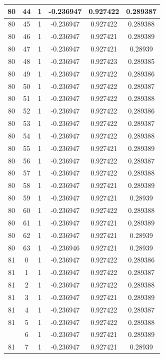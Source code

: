 \documentclass[12pt,a4paper]{article}
\numberwithin{equation}{section}
\numberwithin{figure}{section}
\numberwithin{table}{section}
\begin{document}
\begin{longtable}{|c|c|c|c|c|c|}
80 & 44 & 1 & -0.236947 & 0.927422 & 0.289387 \\ \hline
80 & 45 & 1 & -0.236947 & 0.927422 & 0.289388 \\ \hline
80 & 46 & 1 & -0.236947 & 0.927421 & 0.289389 \\ \hline
80 & 47 & 1 & -0.236947 & 0.927421 & 0.28939 \\ \hline
80 & 48 & 1 & -0.236947 & 0.927423 & 0.289385 \\ \hline
80 & 49 & 1 & -0.236947 & 0.927422 & 0.289386 \\ \hline
80 & 50 & 1 & -0.236947 & 0.927422 & 0.289387 \\ \hline
80 & 51 & 1 & -0.236947 & 0.927422 & 0.289388 \\ \hline
80 & 52 & 1 & -0.236947 & 0.927422 & 0.289386 \\ \hline
80 & 53 & 1 & -0.236947 & 0.927422 & 0.289387 \\ \hline
80 & 54 & 1 & -0.236947 & 0.927422 & 0.289388 \\ \hline
80 & 55 & 1 & -0.236947 & 0.927421 & 0.289389 \\ \hline
80 & 56 & 1 & -0.236947 & 0.927422 & 0.289387 \\ \hline
80 & 57 & 1 & -0.236947 & 0.927422 & 0.289388 \\ \hline
80 & 58 & 1 & -0.236947 & 0.927421 & 0.289389 \\ \hline
80 & 59 & 1 & -0.236947 & 0.927421 & 0.28939 \\ \hline
80 & 60 & 1 & -0.236947 & 0.927422 & 0.289388 \\ \hline
80 & 61 & 1 & -0.236947 & 0.927421 & 0.289389 \\ \hline
80 & 62 & 1 & -0.236947 & 0.927421 & 0.28939 \\ \hline
80 & 63 & 1 & -0.236946 & 0.927421 & 0.28939 \\ \hline
81 & 0 & 1 & -0.236947 & 0.927422 & 0.289386 \\ \hline
81 & 1 & 1 & -0.236947 & 0.927422 & 0.289387 \\ \hline
81 & 2 & 1 & -0.236947 & 0.927422 & 0.289388 \\ \hline
81 & 3 & 1 & -0.236947 & 0.927421 & 0.289389 \\ \hline
81 & 4 & 1 & -0.236947 & 0.927422 & 0.289387 \\ \hline
81 & 5 & 1 & -0.236947 & 0.927422 & 0.289388 \\ \hline
\pagebreak
81 & 6 & 1 & -0.236947 & 0.927421 & 0.289389 \\ \hline
81 & 7 & 1 & -0.236947 & 0.927421 & 0.28939 \\ \hline

\end{longtable}
\end{document}
